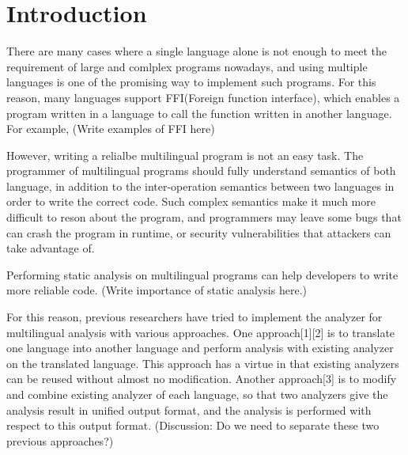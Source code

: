 \section{Introduction}

There are many cases where a single language alone is not enough to meet the
requirement of large and comlplex programs nowadays, and using multiple
languages is one of the promising way to implement such programs. For this
reason, many languages support FFI(Foreign function interface), which enables a
program written in a language to call the function written in another language.
For example, (Write examples of FFI here)

However, writing a relialbe multilingual program is not an easy task. The
programmer of multilingual programs should fully understand semantics of both
language, in addition to the inter-operation semantics between two languages in
order to write the correct code.  Such complex semantics make it much more
difficult to reson about the program, and programmers may leave some bugs that
can crash the program in runtime, or security vulnerabilities that attackers
can take advantage of.

Performing static analysis on multilingual programs can help developers to
write more reliable code. (Write importance of static analysis here.)

For this reason, previous researchers have tried to implement the analyzer for
multilingual analysis with various approaches.  One approach[1][2] is to
translate one language into another language and perform analysis with existing
analyzer on the translated language. This approach has a virtue in that
existing analyzers can be reused without almost no modification.  Another
approach[3] is to modify and combine existing analyzer of each language, so
that two analyzers give the analysis result in unified output format, and the
analysis is performed with respect to this output format.
(Discussion: Do we need to separate these two previous approaches?)

